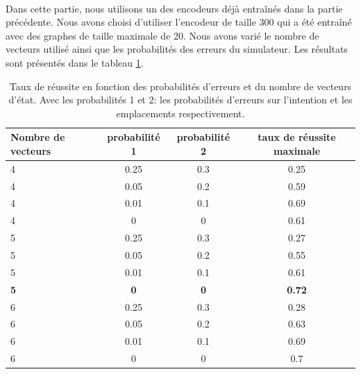 \paragraph{}Dans cette partie, nous utilisons un des encodeurs déjà entraînés dans la partie précédente. Nous avons choisi d'utiliser l'encodeur de taille 300 qui a été entraîné avec des graphes de taille maximale de 20. Nous avons varié le nombre de vecteurs utilisé ainsi que les probabilités des erreurs du simulateur. Les résultats sont présentés dans le tableau \ref{table_results_dis}.
\begin{table}[H]
	\begin{center}
		
		\begin{tabular}{|l|c|c|c|}
			\hline
			\textbf{Nombre de vecteurs} & \textbf{probabilité 1} & \textbf{probabilité 2} & \textbf{taux de réussite maximale}\\
			\hline
			4 & 0.25 & 0.3 & 0.25\\
			\hline
			4 & 0.05 & 0.2 & 0.59\\
			\hline
			\rowcolor{LightCyan}
			4 & 0.01 & 0.1 & 0.69\\
			\hline
			4 & 0 & 0 & 0.61\\
			\hline
			5 & 0.25 & 0.3 & 0.27\\
			\hline
			5 & 0.05 & 0.2 & 0.55\\
			\hline
			5 & 0.01 & 0.1 & 0.61\\
			\hline
			\textbf{5} & \textbf{0} & \textbf{0} & \textbf{0.72}\\
			\hline
			6 & 0.25 & 0.3 & 0.28\\
			\hline
			6 & 0.05 & 0.2 & 0.63\\
			\hline
			\rowcolor{LightCyan}
			6 & 0.01 & 0.1 & 0.69\\
			\hline
			6 & 0 & 0 & 0.7\\
			\hline
		\end{tabular}
		\caption{Taux de réussite en fonction des probabilités d'erreurs et du nombre de vecteurs d'état. Avec les probabilités 1 et 2: les probabilités d'erreurs sur l'intention et les emplacements respectivement.}\label{table_results_dis}
	\end{center}
\end{table}
